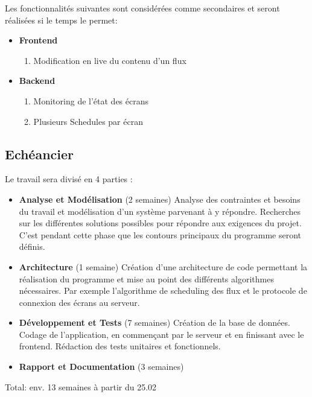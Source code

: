 \documentclass[french]{article}
\begin{document}
\begin{appendices}
Les fonctionnalités suivantes sont considérées comme secondaires et seront réalisées si le temps le permet:
\begin{itemize}
	\item \textbf{Frontend}
	\begin{enumerate}
		\item Modification en live du contenu d'un flux
	\end{enumerate}
	\item \textbf{Backend}
	\begin{enumerate}
		\item Monitoring de l'état des écrans 
		\item Plusieurs Schedules par écran
	\end{enumerate}
\end{itemize}

\subsection{Echéancier}

Le travail sera divisé en 4 parties :
\begin{itemize}
	\item \textbf{Analyse et Modélisation} (2 semaines) \newline
	Analyse des contraintes et besoins du travail et modélisation d'un système parvenant à y répondre. Recherches sur les différentes solutions possibles pour répondre aux exigences du projet. C'est pendant cette phase que les contours principaux du programme seront définis.
	\item \textbf{Architecture} (1 semaine) \newline
	Création d'une architecture de code permettant la réalisation du programme et mise au point des différents algorithmes nécessaires. Par exemple l'algorithme de scheduling des flux et le protocole de connexion des écrans au serveur.
	\item \textbf{Développement et Tests} (7 semaines) \newline
	Création de la base de données.
	Codage de l'application, en commençant par le serveur et en finissant avec le frontend. 
	Rédaction des tests unitaires et fonctionnels.
	\item \textbf{Rapport et Documentation} (3 semaines) \newline
	\end{itemize}
	
Total: env. 13 semaines à partir du 25.02 \newpage
 

\end{appendices}
\end{document}
